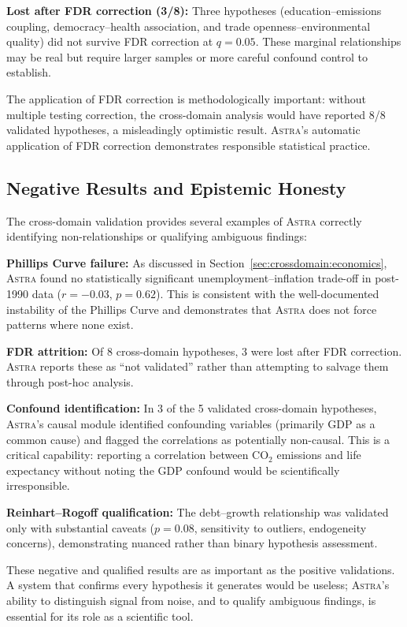 \documentclass[usenatbib]{rasti}
\newcommand{\astra}{\textsc{Astra}\xspace}
\begin{document}
\textbf{Lost after FDR correction (3/8):}
Three hypotheses (education--emissions coupling, democracy--health association, and trade openness--environmental quality) did not survive FDR correction at $q = 0.05$. These marginal relationships may be real but require larger samples or more careful confound control to establish.

The application of FDR correction is methodologically important: without multiple testing correction, the cross-domain analysis would have reported 8/8 validated hypotheses, a misleadingly optimistic result. \astra's automatic application of FDR correction demonstrates responsible statistical practice.

\subsection{Negative Results and Epistemic Honesty}
\label{sec:crossdomain:negatives}

The cross-domain validation provides several examples of \astra correctly identifying non-relationships or qualifying ambiguous findings:

\textbf{Phillips Curve failure:} As discussed in Section~\ref{sec:crossdomain:economics}, \astra found no statistically significant unemployment--inflation trade-off in post-1990 data ($r = -0.03$, $p = 0.62$). This is consistent with the well-documented instability of the Phillips Curve and demonstrates that \astra does not force patterns where none exist.

\textbf{FDR attrition:} Of 8 cross-domain hypotheses, 3 were lost after FDR correction. \astra reports these as ``not validated'' rather than attempting to salvage them through post-hoc analysis.

\textbf{Confound identification:} In 3 of the 5 validated cross-domain hypotheses, \astra's causal module identified confounding variables (primarily GDP as a common cause) and flagged the correlations as potentially non-causal. This is a critical capability: reporting a correlation between CO$_{2}$ emissions and life expectancy without noting the GDP confound would be scientifically irresponsible.

\textbf{Reinhart--Rogoff qualification:} The debt--growth relationship was validated only with substantial caveats ($p = 0.08$, sensitivity to outliers, endogeneity concerns), demonstrating nuanced rather than binary hypothesis assessment.

These negative and qualified results are as important as the positive validations. A system that confirms every hypothesis it generates would be useless; \astra's ability to distinguish signal from noise, and to qualify ambiguous findings, is essential for its role as a scientific tool.
\end{document}
